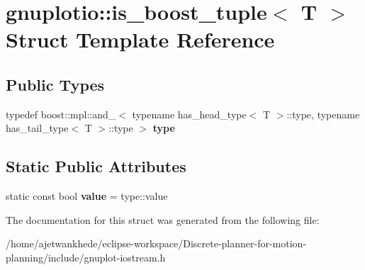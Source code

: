 \hypertarget{structgnuplotio_1_1is__boost__tuple}{}\section{gnuplotio\+:\+:is\+\_\+boost\+\_\+tuple$<$ T $>$ Struct Template Reference}
\label{structgnuplotio_1_1is__boost__tuple}
\subsection*{Public Types}
\begin{DoxyCompactItemize}
\item 
\mbox{\label{structgnuplotio_1_1is__boost__tuple_aa9906d647f157d6224469882e9165ab3}} 
typedef boost\+::mpl\+::and\+\_\+$<$ typename has\+\_\+head\+\_\+type$<$ T $>$\+::type, typename has\+\_\+tail\+\_\+type$<$ T $>$\+::type $>$ {\bfseries type}
\end{DoxyCompactItemize}
\subsection*{Static Public Attributes}
\begin{DoxyCompactItemize}
\item 
\mbox{\label{structgnuplotio_1_1is__boost__tuple_ae6664b02421d28585204104af65a4744}} 
static const bool {\bfseries value} = type\+::value
\end{DoxyCompactItemize}


The documentation for this struct was generated from the following file\+:\begin{DoxyCompactItemize}
\item 
/home/ajetwankhede/eclipse-\/workspace/\+Discrete-\/planner-\/for-\/motion-\/planning/include/gnuplot-\/iostream.\+h\end{DoxyCompactItemize}

